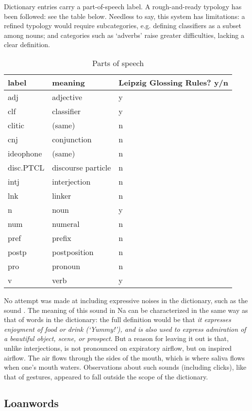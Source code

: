 Dictionary entries carry a part-of-speech label. A rough-and-ready typology has been followed: see the table below. Needless to say, this system has limitations: a refined typology would require subcategories, e.g. defining classifiers as a subset among nouns; and categories such as ‘adverbs' raise greater difficulties, lacking a clear definition.
\begin{table}
	\caption{Parts of speech}
	\centering \label{tab:consul}
	\begin{tabular}{lll}
		\toprule
		label & meaning & Leipzig Glossing Rules? y/n \\
		\midrule
		adj & adjective & y \\
		clf & classifier & y \\
		clitic & (same) & n \\
		cnj & conjunction & n \\
		ideophone & (same) & n \\
		disc.PTCL & discourse particle & n \\
		intj & interjection & n \\
		lnk & linker & n \\
		n & noun & y \\
		num & numeral & n \\
		pref & prefix & n \\
		postp & postposition & n \\
		pro & pronoun & n \\
		v & verb & y \\
		\bottomrule
	\end{tabular}
\end{table}

No attempt was made at including expressive noises in the dictionary, such as the sound . The meaning of this sound in Na can be characterized in the same way as that of words in the dictionary: the full definition would be that  \textit{it expresses enjoyment of food or drink (‘Yummy!'), and is also used to express admiration of a beautiful object, scene, or prospect}. But a reason for leaving it out is that, unlike interjections,   is not pronounced on expiratory airflow, but on inspired airflow. The air flows through the sides of the mouth, which is where saliva flows when one's mouth waters. Observations about such sounds (including clicks), like that of gestures, appeared to fall outside the scope of the dictionary.

	\subsection{Loanwords} \label{sec:loan}

